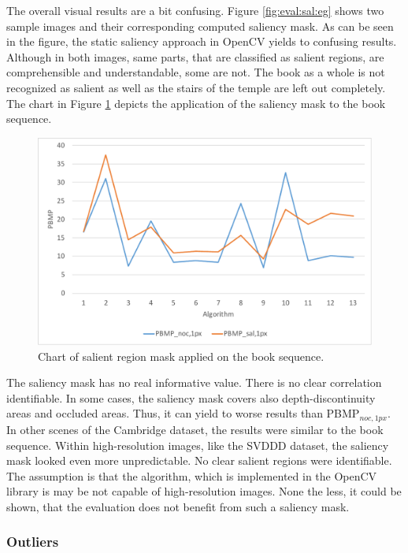 \noindent The overall visual results are a bit confusing.
Figure \ref{fig:eval:sal:eg} shows two sample images and their corresponding computed saliency mask.
As can be seen in the figure, the static saliency approach in OpenCV yields to confusing results.
Although in both images, same parts, that are classified as salient regions, are comprehensible and understandable, some are not.
The book as a whole is not recognized as salient as well as the stairs of the temple are left out completely.
The chart in Figure \ref{fig:eval-plots-pbmp-sal} depicts the application of the saliency mask to the book sequence.

\begin{figure}[h!]
\centering
\includegraphics[width=1.0\textwidth]{src/images/evaluation/plots/01-book-pbmp-sal-1.pdf}
\caption[Chart of salient region mask]{Chart of salient region mask applied on the book sequence.}
\label{fig:eval-plots-pbmp-sal}
\end{figure}

\noindent The saliency mask has no real informative value.
There is no clear correlation identifiable.
In some cases, the saliency mask covers also depth-discontinuity areas and occluded areas.
Thus, it can yield to worse results than PBMP$_{noc,1px}$.
In other scenes of the Cambridge dataset, the results were similar to the book sequence.
Within high-resolution images, like the SVDDD dataset, the saliency mask looked even more unpredictable.
No clear salient regions were identifiable.
The assumption is that the algorithm, which is implemented in the OpenCV library is may be not capable of high-resolution images.
None the less, it could be shown, that the evaluation does not benefit from such a saliency mask.

\subsubsection{Outliers}

